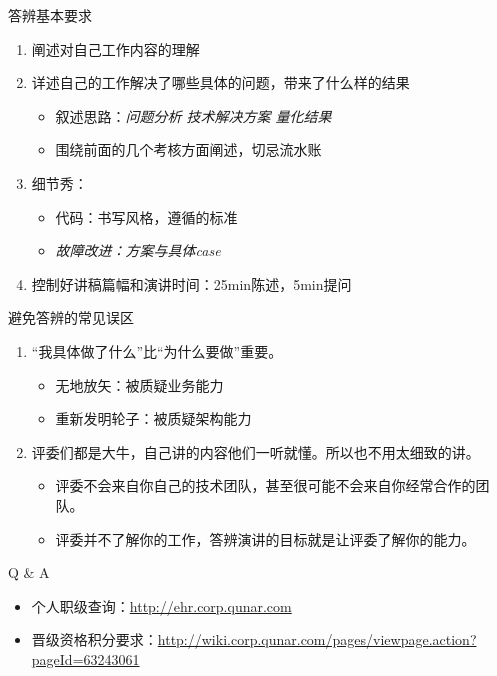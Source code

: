 \documentclass[handout]{beamer}
\begin{document}
\begin{CJK}{UTF8}{gbsn}
\begin{frame}{答辨基本要求}
  \begin{enumerate}
  \item {
    阐述对自己工作内容的理解
  }
  \item {
    详述自己的工作解决了哪些具体的问题，带来了什么样的结果
    \begin{itemize}
    \item { 叙述思路：\emph{问题分析 \textrightarrow 技术解决方案 \textrightarrow 量化结果} }
    \item { 围绕前面的几个考核方面阐述，切忌流水账 }
    \end{itemize}
  }
  \item {
    细节秀：
    \begin{itemize}
    \item { 代码：书写风格，遵循的标准 }
    \item \emph{故障改进：方案与具体case}
    \end{itemize}
  }
  \item {
    控制好讲稿篇幅和演讲时间：25min陈述，5min提问
  }
  \end{enumerate}
\end{frame}

\begin{frame}{避免答辨的常见误区}
  \begin{enumerate}
  \item {
    “我具体做了什么”比“为什么要做”重要。
     {
      \begin{itemize}
      \item 无地放矢：被质疑业务能力
      \item 重新发明轮子：被质疑架构能力
      \end{itemize}
    }
  }
  \item {
    评委们都是大牛，自己讲的内容他们一听就懂。所以也不用太细致的讲。
     {
      \begin{itemize}
      \item { 评委不会来自你自己的技术团队，甚至很可能不会来自你经常合作的团队。}
      \item { 评委并不了解你的工作，答辨演讲的目标就是让评委了解你的能力。 }
      \end{itemize}
    }
  }
  \end{enumerate}
  
\end{frame}

\begin{frame}{Q \& A}
  \begin{itemize}
  \item {
    个人职级查询：\url{http://ehr.corp.qunar.com}
  }
  \item {
    晋级资格积分要求：\url{http://wiki.corp.qunar.com/pages/viewpage.action?pageId=63243061}
  }
  \end{itemize}
\end{frame}


\end{CJK}
\end{document}
